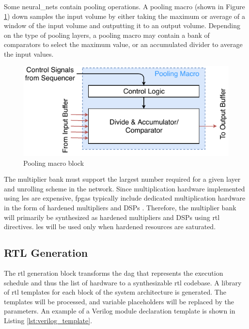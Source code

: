 \documentclass{uw-ece-wkrpt}
\begin{document}
Some \glspl{neural_net} contain pooling operations. A pooling macro (shown in Figure \ref{fig:pooling_macro}) down samples the input volume by either taking the maximum or average of a window of the input volume and outputting it to an output volume. Depending on the type of pooling layers, a pooling macro may contain a bank of comparators to select the maximum value, or an accumulated divider to average the input values.

\begin{figure}
\centering
\includegraphics{figures/pooling_macro}
\caption{Pooling macro block \cite{Ma2017An-automatic-RT}}\label{fig:pooling_macro}
\end{figure}

The multiplier bank must support the largest number required for a given layer and unrolling scheme in the network. Since multiplication hardware implemented using \glspl{le} are expensive, \glspl{fpga} typically include dedicated multiplication hardware in the form of hardened multipliers and DSPs \cite{Intel-Corp.2018IntelR-ArriaR-1}. Therefore, the multiplier bank will primarily be synthesized as hardened multipliers and DSPs using \gls{rtl} directives. \Glspl{le} will be used only when hardened resources are saturated.

\subsection{RTL Generation}\label{sec:rtl_gen}

The \gls{rtl} generation block transforms the \gls{dag} that represents the execution schedule and thus the list of hardware to a synthesizable \gls{rtl} codebase. A library of \gls{rtl} templates for each block of the system architecture is generated. The templates will be processed, and variable placeholders will be replaced by the parameters. An example of a Verilog module declaration template is shown in Listing \ref{lst:verilog_template}.
\end{document}

